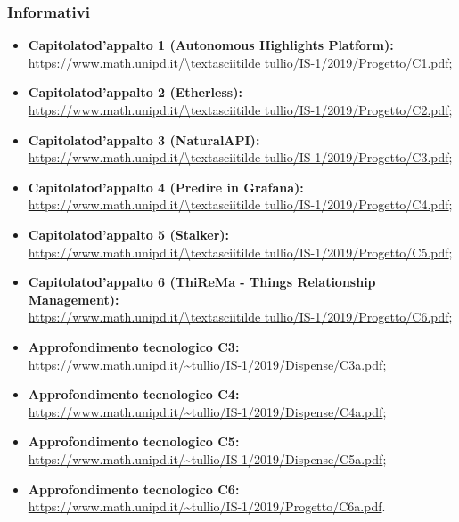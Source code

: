 \subsubsection{Informativi}
\begin{itemize}
    \item \textbf{Capitolato\glo d'appalto 1 (Autonomous Highlights Platform):}\\ 
    \url{https://www.math.unipd.it/\textasciitilde tullio/IS-1/2019/Progetto/C1.pdf};
    \item \textbf{Capitolato\glo d'appalto 2 (Etherless):}\\ 
	\url{https://www.math.unipd.it/\textasciitilde tullio/IS-1/2019/Progetto/C2.pdf};
    \item \textbf{Capitolato\glo d'appalto 3 (NaturalAPI):}\\ 
    \url{https://www.math.unipd.it/\textasciitilde tullio/IS-1/2019/Progetto/C3.pdf};
    \item \textbf{Capitolato\glo d'appalto 4 (Predire in Grafana):}\\ 
    \url{https://www.math.unipd.it/\textasciitilde tullio/IS-1/2019/Progetto/C4.pdf};
    \item \textbf{Capitolato\glo d'appalto 5 (Stalker):}\\ 
    \url{https://www.math.unipd.it/\textasciitilde tullio/IS-1/2019/Progetto/C5.pdf};
    \item \textbf{Capitolato\glo d'appalto 6 (ThiReMa - Things Relationship Management):}\\ 
    \url{https://www.math.unipd.it/\textasciitilde tullio/IS-1/2019/Progetto/C6.pdf};
    \item \textbf{Approfondimento tecnologico C3:}
    \url{https://www.math.unipd.it/~tullio/IS-1/2019/Dispense/C3a.pdf};
    \item \textbf{Approfondimento tecnologico C4:}
    \url{https://www.math.unipd.it/~tullio/IS-1/2019/Dispense/C4a.pdf};
    \item \textbf{Approfondimento tecnologico C5:}
    \url{https://www.math.unipd.it/~tullio/IS-1/2019/Dispense/C5a.pdf};
    \item \textbf{Approfondimento tecnologico C6:}
    \url{https://www.math.unipd.it/~tullio/IS-1/2019/Progetto/C6a.pdf}.
\end{itemize}

	
	

